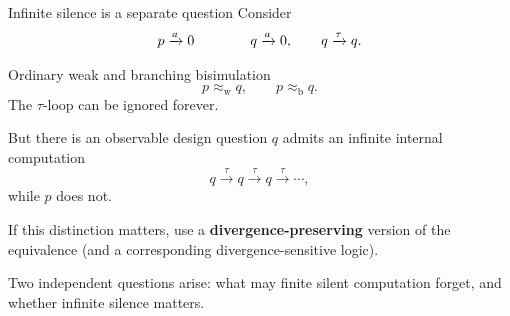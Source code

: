 \documentclass[handout,aspectratio=169,11pt]{beamer}
\newcommand{\step}[1]{\xrightarrow{#1}}
\newcommand{\Takeaway}[1]{\begin{exampleblock}{}#1\end{exampleblock}}
\begin{document}





\begin{frame}{Infinite silence is a separate question}
  Consider
  \[
  \begin{array}{c@{\qquad\qquad}c}
    p\step{a}0
    &
    q\step{a}0,\qquad q\step{\tau}q .
  \end{array}
  \]

  \begin{block}{Ordinary weak and branching bisimulation}
    \[
       p\approx_{\mathrm w}q,
       \qquad
       p\approx_{\mathrm b}q.
    \]
    The $\tau$-loop can be ignored forever.
  \end{block}

  \begin{alertblock}{But there is an observable design question}
    $q$ admits an infinite internal computation
    \[
       q\step{\tau}q\step{\tau}q\step{\tau}\cdots,
    \]
    while $p$ does not.
  \end{alertblock}


  \vspace{-0.3cm}
  If this distinction matters, use a
  \textbf{divergence-preserving} version of the equivalence
  (and a corresponding divergence-sensitive logic).

  \Takeaway{Two independent questions arise:
  what may finite silent computation forget, and whether infinite silence matters.}
\end{frame}
\end{document}

